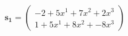 \documentclass[preview]{standalone}
\begin{document}
\begin{align*}
\mathbf{s_1} = \begin{pmatrix}-2 + 5x^{1} + 7x^{2} + 2x^{3} \\ 1 + 5x^{1} + 8x^{2} + -8x^{3}\end{pmatrix}
\end{align*}
\end{document}
